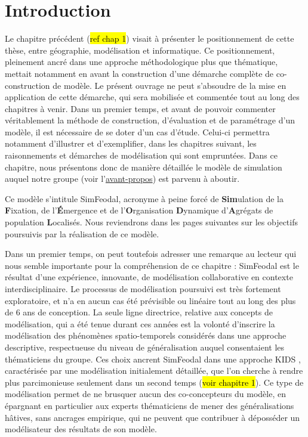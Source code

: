 \clearpage


\section*{Introduction}
\label{sec:chap2-intro}

Le chapitre précédent (\hl{ref chap 1}) visait à présenter le positionnement de cette thèse, entre géographie, modélisation et informatique.
Ce positionnement, pleinement ancré dans une approche méthodologique plus que thématique, mettait notamment en avant la construction d'une démarche complète de co-construction de modèle.
Le présent ouvrage ne peut s'absoudre de la mise en application de cette démarche, qui sera mobilisée et commentée tout au long des chapitres à venir.
Dans un premier temps, et avant de pouvoir commenter véritablement la méthode de construction, d'évaluation et de paramétrage d'un modèle, il est nécessaire de se doter d'un cas d'étude.
Celui-ci permettra notamment d'illustrer et d'exemplifier, dans les chapitres suivant, les raisonnements et démarches de modélisation qui sont empruntées.
Dans ce chapitre, nous présentons donc de manière détaillée le modèle de simulation auquel notre groupe (voir l'\hyperlink{avant-propos}{avant-propos}) est parvenu à aboutir.

Ce modèle s'intitule SimFeodal, acronyme à peine forcé de \og \textbf{Sim}ulation de la \textbf{F}ixation, de l'\textbf{É}mergence et de l'\textbf{O}rganisation \textbf{D}ynamique d'\textbf{A}grégats de population \textbf{L}ocalisés\fg{}.
Nous reviendrons dans les pages suivantes sur les objectifs poursuivis par la réalisation de ce modèle.

Dans un premier temps, on peut toutefois adresser une remarque au lecteur qui nous semble importante pour la compréhension de ce chapitre : SimFeodal est le résultat d'une expérience, innovante, de modélisation collaborative en contexte interdisciplinaire.
Le processus de modélisation poursuivi est très fortement exploratoire, et n'a en aucun cas été prévisible ou linéaire tout au long des plus de 6 ans de conception.
La seule ligne directrice, relative aux concepts de modélisation, qui a été tenue durant ces années est la volonté d'inscrire la modélisation des phénomènes spatio-temporels considérés dans une approche descriptive, respectueuse du niveau de généralisation auquel consentaient les thématiciens du groupe.
Ces choix ancrent SimFeodal dans une approche \og KIDS\fg{} \autocite{edmonds_kiss_2005}, caractérisée par une modélisation initialement détaillée, que l'on cherche à rendre plus parcimonieuse seulement dans un second temps (\hl{voir chapitre 1}).
Ce type de modélisation permet de ne brusquer aucun des co-concepteurs du modèle, en épargnant en particulier aux experts thématiciens de mener des généralisations hâtives, sans ancrages empirique, qui ne peuvent que contribuer à déposséder un modélisateur des résultats de son modèle.

